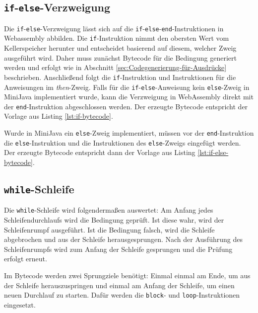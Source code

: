 \subsection{\lstinline{if}-\lstinline{else}-Verzweigung}
Die \lstinline{if}-\lstinline{else}-Verzweigung lässt sich auf die \lstinline{if}-\lstinline{else}-\lstinline{end}-Instruktionen in Webassembly abbilden. Die \lstinline{if}-Instruktion nimmt den obersten Wert vom Kellerspeicher herunter und entscheidet basierend auf diesem, welcher Zweig ausgeführt wird. Daher muss zunächst Bytecode für die Bedingung generiert werden und erfolgt wie in Abschnitt \ref{sec:Codegenerierung-für-Ausdrücke} beschrieben. Anschließend folgt die \lstinline{if}-Instruktion und Instruktionen für die Anweisungen im \emph{then}-Zweig. Falls für die \lstinline{if}-\lstinline{else}-Anweisung kein \lstinline{else}-Zweig in MiniJava implementiert wurde, kann die Verzweigung in WebAssembly direkt mit der \lstinline{end}-Instruktion abgeschlossen werden. Der erzeugte Bytecode entspricht der Vorlage aus Listing \ref{lst:if-bytecode}.

Wurde in MiniJava ein \lstinline{else}-Zweig implementiert, müssen vor der \lstinline{end}-Instruktion die \lstinline{else}-Instruktion und die Instruktionen des \lstinline{else}-Zweigs eingefügt werden. Der erzeugte Bytecode entspricht dann der Vorlage aus Listing \ref{lst:if-else-bytecode}.





\subsection{\lstinline{while}-Schleife}

Die \lstinline{while}-Schleife wird folgendermaßen auswertet: Am Anfang jedes Schleifendurchlaufs wird die Bedingung geprüft. Ist diese wahr, wird der Schleifenrumpf ausgeführt. Ist die Bedingung falsch, wird die Schleife abgebrochen und aus der Schleife herausgesprungen. Nach der Ausführung des Schleifenrumpfs wird zum Anfang der Schleife gesprungen und die Prüfung erfolgt erneut.

Im Bytecode werden zwei Sprungziele benötigt: Einmal einmal am Ende, um aus der Schleife herauszuspringen und einmal am Anfang der Schleife, um einen neuen Durchlauf zu starten. Dafür werden die \lstinline{block}- und \lstinline{loop}-Instruktionen eingesetzt.

